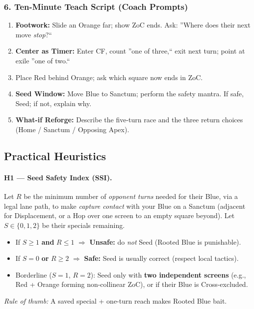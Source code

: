 \documentclass[11pt]{article}
\begin{document}
\subsubsection*{6. Ten-Minute Teach Script (Coach Prompts)}
\begin{enumerate}\itemsep0.25em
  \item \textbf{Footwork:} Slide an Orange far; show ZoC ends. Ask: ''Where does their next move \emph{stop}?``
  \item \textbf{Center as Timer:} Enter CF, count ''one of three,`` exit next turn; point at exile ''one of two.``
  \item {} Place Red behind Orange; ask which square now ends in ZoC.
  \item \textbf{Seed Window:} Move Blue to Sanctum; perform the safety mantra. If safe, Seed; if not, explain why.
  \item \textbf{What-if Reforge:} Describe the five-turn race and the three return choices (Home / Sanctum / Opposing Apex).
\end{enumerate}

\subsection*{Practical Heuristics}
\paragraph{H1 --- Seed Safety Index (SSI).}
Let $R$ be the minimum number of \emph{opponent turns} needed for their Blue, via a legal lane path, to make \emph{capture contact} with your Blue on a Sanctum (adjacent for Displacement, or a Hop over one screen to an empty square beyond). Let $S\in\{0,1,2\}$ be their specials remaining.
\begin{itemize}
  \item If $S\ge 1$ \textbf{and} $R\le 1$ $\Rightarrow$ \textbf{Unsafe:} do \emph{not} Seed (Rooted Blue is punishable).
  \item If $S=0$ \textbf{or} $R\ge 2$ $\Rightarrow$ \textbf{Safe:} Seed is usually correct (respect local tactics).
  \item Borderline ($S=1$, $R=2$): Seed only with \textbf{two independent screens} (e.g., Red + Orange forming non-collinear ZoC), or if their Blue is Cross-excluded.
\end{itemize}
\emph{Rule of thumb:} A saved special + one-turn reach makes Rooted Blue bait.
\end{document}
